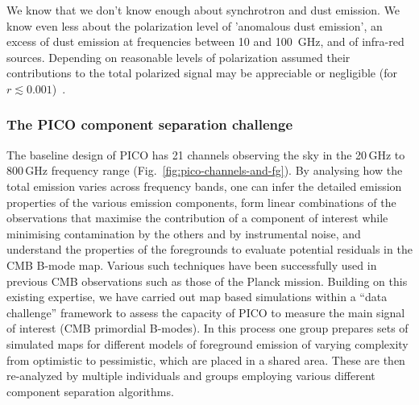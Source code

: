 \documentclass[PICOReport.tex]{subfiles}
\begin{document}
We know that we don't know enough about synchrotron and dust emission. We know even less about the polarization level of 'anomalous dust emission', an excess of dust emission at frequencies between 10 and 100~GHz, and of infra-red sources. Depending on reasonable levels of polarization assumed their contributions to the total polarized signal may be appreciable or negligible (for $r\lesssim 0.001$)~\citep{??}.  


 

%

\subsubsection{The PICO component separation challenge}

The baseline design of PICO has 21 channels observing the sky in the 20\,GHz to 800\,GHz frequency range (Fig.~\ref{fig:pico-channels-and-fg}). By analysing how the total emission varies across frequency bands, one can infer the detailed emission properties of the various emission components, form linear combinations of the observations that maximise the contribution of a component of interest while minimising contamination by the others and by instrumental noise, and understand the properties of the foregrounds to evaluate potential residuals in the CMB B-mode map. Various such techniques have been successfully used in previous CMB observations such as those of the Planck mission. Building on this existing expertise, we have carried out map based simulations within a ``data challenge'' framework to assess the capacity of PICO to measure the main signal of interest (CMB primordial B-modes). In this process one group prepares sets of simulated maps for different models of foreground emission of varying complexity from optimistic to pessimistic, which are placed in a shared area. These are then re-analyzed by multiple individuals and groups employing various different component separation algorithms.
\end{document}
